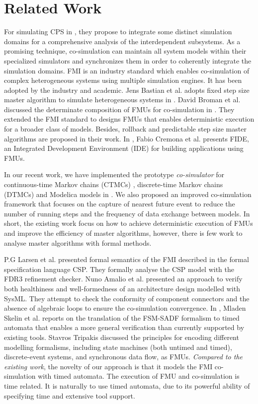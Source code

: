 \section{Related Work}
\label{sec:relateworks}
For simulating CPS in \cite{GeorgMRW14}, they propose to integrate some distinct simulation domains for a comprehensive analysis of the interdependent subsystems. As a promising technique, co-simulation \cite{Bogomolov2015Co} can maintain all system models within their specialized simulators
and synchronizes them in order to coherently integrate the simulation domains. FMI \cite{Blochwitz2011The}\cite{FMI2INTRO} is an industry standard which enables co-simulation of complex heterogeneous systems using multiple simulation engines. It has been adopted by the industry and academic. Jens Bastian et al. adopts fixed step size master algorithm to simulate heterogeneous
systems in \cite{Bastian2011Master}.
David Broman et al. discussed the determinate composition of FMUs for co-simulation in \cite{BromanBGLMTW13}. They extended the FMI standard to designs FMUs that enables deterministic execution for a broader class of models. Besides, rollback and predictable step size master algorithms are proposed in their work. In \cite{CremonaLTBL16}, Fabio Cremona et al. presents FIDE, an Integrated Development Environment
(IDE) for building applications using FMUs. 

In our recent work, we have implemented the prototype \textit{co-simulator} for continuous-time Markov chains (CTMCs) \cite{DanosHGS17}, discrete-time Markov chains (DTMCs) \cite{Guerry13} and Modelica models in \cite{LiuJWCD16}. We also proposed an improved co-simulation framework that focuses on the capture of nearest future event to reduce the number of running steps and the frequency of data exchange between models. In short, the existing work focus on how to achieve deterministic execution of FMUs and improve the efficiency of master algorithms, however, there is few work to analyse master algorithms with formal methods.

P.G Larsen et al. \cite{Larsen2016Integrated} presented formal semantics of the FMI described in the formal specification language CSP. They 
formally analyse the CSP model with the FDR3 refinement checker. Nuno Amalio et al. \cite{AmalioPCW16} presented an approach to verify both healthiness and well-formedness of an architecture design modelled with SysML. They attempt to check the conformity of component connectors and the absence of algebraic loops to ensure the co-simulation convergence.
In \cite{SkelinWOHL15}, Mladen Skelin et al. reports on the translation of the FSM-SADF formalism to timed automata that enables a more general
verification than currently supported by existing tools. Stavros Tripakis \cite{Tripakis15} discussed the principles for encoding different modelling formalisms, including state machines (both untimed and timed), discrete-event systems, and synchronous data flow, as FMUs. 
\emph{Compared to the existing work}, the novelty of our approach is that it models the FMI co-simulation with timed automata. The execution of FMU and co-simulation is time related. It is naturally to use timed automata, due to its powerful ability of specifying time and extensive tool support.


